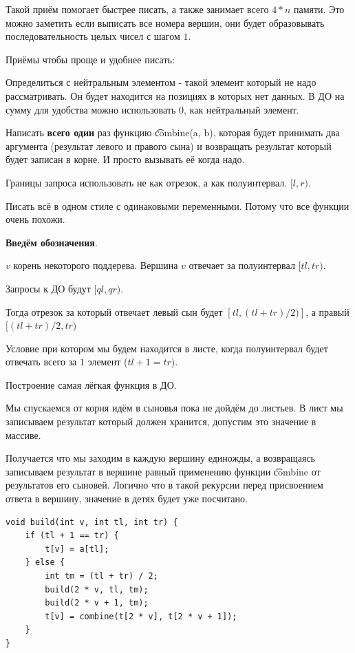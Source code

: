 Такой приём помогает быстрее писать, а также занимает всего $4 * n$ памяти. Это можно заметить если выписать все номера вершин, они будет образовывать последовательность целых чисел с шагом $1$.


Приёмы чтобы проще и удобнее писать:

\up \up
\begin{MyList}[0pt]
	\item Определиться с нейтральным элементом - такой элемент который не надо рассматривать. Он будет находится на позициях в которых нет данных. В ДО на сумму для удобства можно использовать $0$, как нейтральный элемент.
	\item Написать {\bf всего один} раз функцию \t{combine(a, b)}, которая будет принимать два аргумента (результат левого и правого сына) и возвращать результат который будет записан в корне. И просто вызывать её когда надо.
	\item Границы запроса использовать не как отрезок, а как полуинтервал. $[l, r)$.
	\item Писать всё в одном стиле с одинаковыми переменными. Потому что все функции очень похожи.
\end{MyList} \up \up

{\bf Введём обозначения}.

$v$ корень некоторого поддерева. Вершина $v$ отвечает за полуинтервал $[tl, tr)$.

Запросы к ДО будут $[ql, qr)$.

Тогда отрезок за который отвечает левый сын будет $[tl, (tl + tr) / 2)]$, а правый $[(tl + tr) / 2, tr)$

Условие при котором мы будем находится в листе, когда полуинтервал будет отвечать всего за $1$ элемент ($tl + 1 = tr$).


\pagebreak


Построение самая лёгкая функция в ДО. 

Мы спускаемся от корня идём в сыновья пока не дойдём до листьев. В лист мы записываем результат который должен хранится, допустим это значение в массиве.

Получается что мы заходим в каждую вершину единожды, а возвращаясь записываем результат в вершине равный применению функции \t{combine} от результатов его сыновей. Логично что в такой рекурсии перед присвоением ответа в вершину, значение в детях будет уже посчитано.
\up \up
\begin{verbatim}
void build(int v, int tl, int tr) {
	if (tl + 1 == tr) {
		t[v] = a[tl];
	} else {
		int tm = (tl + tr) / 2;
		build(2 * v, tl, tm);
		build(2 * v + 1, tm);
		t[v] = combine(t[2 * v], t[2 * v + 1]);
	}
}
\end{verbatim}
\up \up

